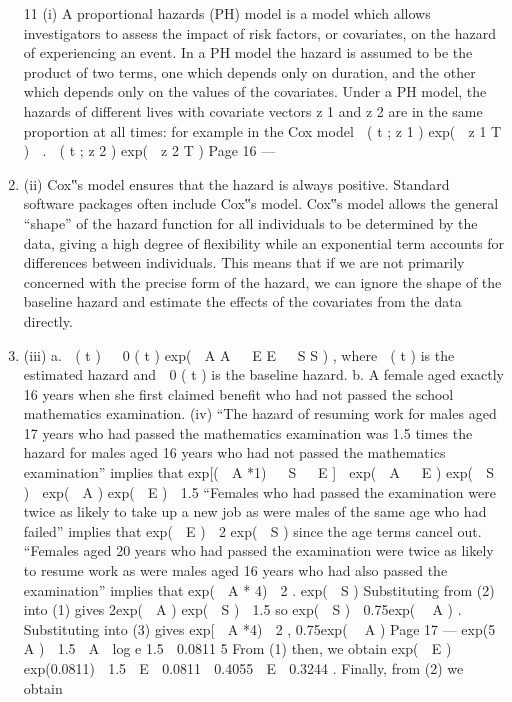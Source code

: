 \documentclass[a4paper,12pt]{article}
\begin{document}
\begin{enumerate}
11
(i) A proportional hazards (PH) model is a model which allows investigators to
assess the impact of risk factors, or covariates, on the hazard of experiencing
an event.
In a PH model the hazard is assumed to be the product of two terms, one
which depends only on duration, and the other which depends only on the
values of the covariates.
Under a PH model, the hazards of different lives with covariate vectors z 1 and
z 2 are in the same proportion at all times:
for example in the Cox model
 ( t ; z 1 ) exp(  z 1 T )

.
 ( t ; z 2 ) exp(  z 2 T )
Page 16  — %
\item (ii) Cox‟s model ensures that the hazard is always positive. Standard software
packages often include Cox‟s model.
Cox‟s model allows the general “shape” of the hazard function for all
individuals to be determined by the data, giving a high degree of flexibility
while an exponential term accounts for differences between individuals.
This means that if we are not primarily concerned with the precise form of the
hazard, we can ignore the shape of the baseline hazard and estimate the effects
of the covariates from the data directly.
\item (iii)
a.
 ( t )   0 ( t ) exp(  A A   E E   S S ) , where
 ( t )
is the estimated
hazard and  0 ( t ) is the baseline hazard.
b.
A female aged exactly 16 years when she first claimed benefit who had
not passed the school mathematics examination.
(iv) “The hazard of resuming work for males aged 17 years who had passed the
mathematics examination was 1.5 times the hazard for males aged 16 years
who had not passed the mathematics examination” implies that
exp[(  A *1)   S   E ]
 exp(  A   E )
exp(  S )
 exp(  A ) exp(  E )  1.5
“Females who had passed the examination were twice as likely to take up a
new job as were males of the same age who had failed” implies that
exp(  E )
 2
exp(  S )
since the age terms cancel out.
“Females aged 20 years who had passed the examination were twice as likely
to resume work as were males aged 16 years who had also passed the
examination” implies that
exp(  A * 4)
 2 .
exp(  S )
Substituting from (2) into (1) gives
2exp(  A ) exp(  S )  1.5
so
exp(  S )  0.75exp(  A ) .
Substituting into (3) gives
exp[  A *4)
 2 ,
0.75exp(  A )
Page 17  — %
exp(5  A )  1.5
 A 
log e 1.5
 0.0811
5
From (1) then, we obtain
exp(  E ) exp(0.0811)  1.5
 E  0.0811  0.4055
 E  0.3244 .
Finally, from (2) we obtain

\end{enumerate}
\end{document}

